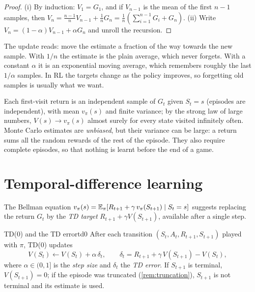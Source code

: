 \begin{proof}
  (i) By induction: $V_1 = G_1$, and if $V_{n-1}$ is the mean of the first
  $n - 1$ samples, then $V_n = \frac{n-1}{n} V_{n-1} + \frac{1}{n} G_n =
  \frac{1}{n} \left( \sum_{i=1}^{n-1} G_i + G_n \right)$. (ii) Write
  $V_n = (1 - \alpha) V_{n-1} + \alpha G_n$ and unroll the recursion.
\end{proof}

\begin{intuition}
  The update reads: move the estimate a fraction of the way towards the
  new sample. With $1/n$ the estimate is the plain average, which never
  forgets. With a constant $\alpha$ it is an exponential moving average,
  which remembers roughly the last $1/\alpha$ samples. In RL the targets
  change as the policy improves, so forgetting old samples is usually what
  we want.
\end{intuition}

Each first-visit return is an independent sample of $G_t$ given $S_t = s$
(episodes are independent), with mean $v_\pi(s)$ and finite variance; by
the strong law of large numbers, $V(s) \to v_\pi(s)$ almost surely for every
state visited infinitely often. Monte Carlo estimates are \emph{unbiased},
but their variance can be large: a return sums all the random rewards of
the rest of the episode. They also require complete episodes, so that
nothing is learnt before the end of a game.

\section{Temporal-difference learning}

The Bellman equation $v_\pi(s) = \mathbb{E}_\pi[R_{t+1} + \gamma\, v_\pi(S_{t+1})
\mid S_t = s]$ suggests replacing the return $G_t$ by the \emph{TD
target} $R_{t+1} + \gamma V(S_{t+1})$, available after a single step.

\begin{definition}{TD(0) and the TD error}{td0}
  After each transition $(S_t, A_t, R_{t+1}, S_{t+1})$ played with $\pi$,
  TD(0) updates
  \begin{equation}
    \label{eq:td0}
    V(S_t) \gets V(S_t) + \alpha\, \delta_t, \qquad
    \delta_t = R_{t+1} + \gamma\, V(S_{t+1}) - V(S_t),
  \end{equation}
  where $\alpha \in (0, 1]$ is the \emph{step size} and $\delta_t$ the
  \emph{TD error}. If $S_{t+1}$ is terminal, $V(S_{t+1}) = 0$; if the
  episode was truncated (\cref{rem:truncation}), $S_{t+1}$ is not terminal
  and its estimate is used.
\end{definition}

